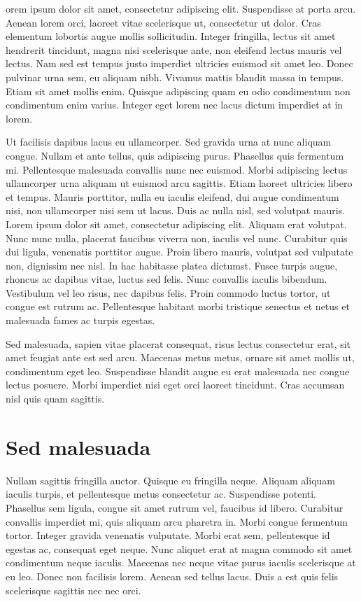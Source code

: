 orem ipsum dolor sit amet, consectetur adipiscing elit. Suspendisse at porta arcu. Aenean lorem orci, laoreet vitae scelerisque ut, consectetur ut dolor. Cras elementum lobortis augue mollis sollicitudin. Integer fringilla, lectus sit amet hendrerit tincidunt, magna nisi scelerisque ante, non eleifend lectus mauris vel lectus. Nam sed est tempus justo imperdiet ultricies euismod sit amet leo. Donec pulvinar urna sem, eu aliquam nibh. Vivamus mattis blandit massa in tempus. Etiam sit amet mollis enim. Quisque adipiscing quam eu odio condimentum non condimentum enim varius. Integer eget lorem nec lacus dictum imperdiet at in lorem.

Ut facilisis dapibus lacus eu ullamcorper. Sed gravida urna at nunc aliquam congue. Nullam et ante tellus, quis adipiscing purus. Phasellus quis fermentum mi. Pellentesque malesuada convallis nunc nec euismod. Morbi adipiscing lectus ullamcorper urna aliquam ut euismod arcu sagittis. Etiam laoreet ultricies libero et tempus. Mauris porttitor, nulla eu iaculis eleifend, dui augue condimentum nisi, non ullamcorper nisi sem ut lacus. Duis ac nulla nisl, sed volutpat mauris. Lorem ipsum dolor sit amet, consectetur adipiscing elit. Aliquam erat volutpat. Nunc nunc nulla, placerat faucibus viverra non, iaculis vel nunc. Curabitur quis dui ligula, venenatis porttitor augue. Proin libero mauris, volutpat sed vulputate non, dignissim nec nisl. In hac habitasse platea dictumst. Fusce turpis augue, rhoncus ac dapibus vitae, luctus sed felis. Nunc convallis iaculis bibendum. Vestibulum vel leo risus, nec dapibus felis. Proin commodo luctus tortor, ut congue est rutrum ac. Pellentesque habitant morbi tristique senectus et netus et malesuada fames ac turpis egestas.

Sed malesuada, sapien vitae placerat consequat, risus lectus consectetur erat, sit amet feugiat ante est sed arcu. Maecenas metus metus, ornare sit amet mollis ut, condimentum eget leo. Suspendisse blandit augue eu erat malesuada nec congue lectus posuere. Morbi imperdiet nisi eget orci laoreet tincidunt. Cras accumsan nisl quis quam sagittis. 

\section{Sed malesuada}

Nullam sagittis fringilla auctor. Quisque eu fringilla neque. Aliquam aliquam iaculis turpis, et pellentesque metus consectetur ac. Suspendisse potenti. Phasellus sem ligula, congue sit amet rutrum vel, faucibus id libero. Curabitur convallis imperdiet mi, quis aliquam arcu pharetra in. Morbi congue fermentum tortor. Integer gravida venenatis vulputate. Morbi erat sem, pellentesque id egestas ac, consequat eget neque. Nunc aliquet erat at magna commodo sit amet condimentum neque iaculis. Maecenas nec neque vitae purus iaculis scelerisque at eu leo. Donec non facilisis lorem. Aenean sed tellus lacus. Duis a est quis felis scelerisque sagittis nec nec orci.

